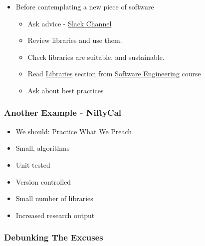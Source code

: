 \begin{itemize}
\itemsep1pt\parskip0pt
\item
  Before contemplating a new piece of software

  \begin{itemize}
  \itemsep1pt\parskip0pt
  \item
    Ask advice - \href{https://ucl-programming-hub.slack.com/}{Slack
    Channel}
  \item
    Review libraries and use them.
  \item
    Check libraries are suitable, and sustainable.
  \item
    Read
    \href{http://development.rc.ucl.ac.uk/training/engineering/ch04packaging/01Libraries.html}{Libraries}
    section from
    \href{http://github-pages.ucl.ac.uk/rsd-engineeringcourse/}{Software
    Engineering} course
  \item
    Ask about best practices
  \end{itemize}
\end{itemize}

\subsubsection{Another Example -
NiftyCal}\label{another-example---niftycal}

\begin{itemize}
\itemsep1pt\parskip0pt
\item
  We should: Practice What We Preach
\item
  Small, algorithms
\item
  Unit tested
\item
  Version controlled
\item
  Small number of libraries
\item
  Increased research output
\end{itemize}

\subsubsection{Debunking The Excuses}\label{debunking-the-excuses}

